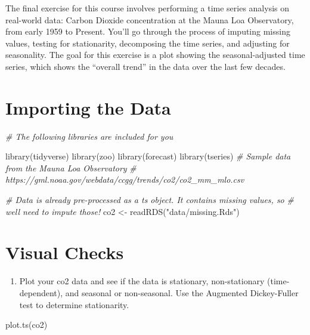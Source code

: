 \documentclass[
]{book}
\newenvironment{Shaded}{\begin{snugshade}}{\end{snugshade}}
\newcommand{\CommentTok}[1]{\textcolor[rgb]{0.56,0.35,0.01}{\textit{#1}}}
\newcommand{\FunctionTok}[1]{\textcolor[rgb]{0.00,0.00,0.00}{#1}}
\newcommand{\NormalTok}[1]{#1}
\newcommand{\OtherTok}[1]{\textcolor[rgb]{0.56,0.35,0.01}{#1}}
\newcommand{\StringTok}[1]{\textcolor[rgb]{0.31,0.60,0.02}{#1}}
\providecommand{\tightlist}{%
  \setlength{\itemsep}{0pt}\setlength{\parskip}{0pt}}
\begin{document}
The final exercise for this course involves performing a time series analysis on real-world data: Carbon Dioxide concentration at the Mauna Loa Observatory, from early 1959 to Present. You'll go through the process of imputing missing values, testing for stationarity, decomposing the time series, and adjusting for seasonality. The goal for this exercise is a plot showing the seasonal-adjusted time series, which shows the ``overall trend'' in the data over the last few decades.

\hypertarget{importing-the-data}{%
\section{Importing the Data}\label{importing-the-data}}

\begin{Shaded}
\begin{Highlighting}[]
\CommentTok{\# The following libraries are included for you}

\FunctionTok{library}\NormalTok{(tidyverse)}
\FunctionTok{library}\NormalTok{(zoo)}
\FunctionTok{library}\NormalTok{(forecast)}
\FunctionTok{library}\NormalTok{(tseries)}
\CommentTok{\# Sample data from the Mauna Loa Observatory}
\CommentTok{\# https://gml.noaa.gov/webdata/ccgg/trends/co2/co2\_mm\_mlo.csv}

\CommentTok{\# Data is already pre{-}processed as a \textasciigrave{}ts\textasciigrave{} object. It contains missing values, so}
\CommentTok{\# we\textquotesingle{}ll need to impute those!}
\NormalTok{co2 }\OtherTok{\textless{}{-}} \FunctionTok{readRDS}\NormalTok{(}\StringTok{"data/missing.Rds"}\NormalTok{)}
\end{Highlighting}
\end{Shaded}

\hypertarget{visual-checks}{%
\section{Visual Checks}\label{visual-checks}}

\begin{enumerate}
\def\labelenumi{\arabic{enumi}.}
\tightlist
\item
  Plot your co2 data and see if the data is stationary, non-stationary (time-dependent), and seasonal or non-seasonal. Use the Augmented Dickey-Fuller test to determine stationarity.
\end{enumerate}

\begin{Shaded}
\begin{Highlighting}[]
\FunctionTok{plot.ts}\NormalTok{(co2)}
\end{Highlighting}
\end{Shaded}
\end{document}

